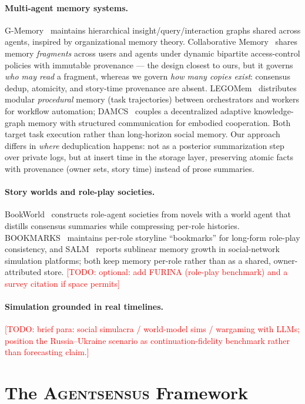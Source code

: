 \documentclass[11pt]{article}
\newcommand{\sysname}{\textsc{Agentsensus}}
\newcommand{\todo}[1]{\textcolor{red}{[TODO: #1]}}
\begin{document}
\paragraph{Multi-agent memory systems.}
G-Memory~\cite{gmemory2025} maintains hierarchical insight/query/interaction
graphs shared across agents, inspired by organizational memory theory.
Collaborative Memory~\cite{collabmem2025} shares memory \emph{fragments}
across users and agents under dynamic bipartite access-control policies with
immutable provenance --- the design closest to ours, but it governs
\emph{who may read} a fragment, whereas we govern \emph{how many copies
exist}: consensus dedup, atomicity, and story-time provenance are absent.
LEGOMem~\cite{legomem2025} distributes modular \emph{procedural} memory
(task trajectories) between orchestrators and workers for workflow
automation; DAMCS~\cite{damcs2025} couples a decentralized adaptive
knowledge-graph memory with structured communication for embodied
cooperation. Both target task execution rather than long-horizon social
memory. Our approach differs in \emph{where} deduplication happens: not as a
posterior summarization step over private logs, but at insert time in the
storage layer, preserving atomic facts with provenance (owner sets, story
time) instead of prose summaries.

\paragraph{Story worlds and role-play societies.}
BookWorld~\cite{chen2025bookworld} constructs role-agent societies from
novels with a world agent that distills consensus summaries while compressing
per-role histories. BOOKMARKS~\cite{bookmarks2026} maintains per-role
storyline ``bookmarks'' for long-form role-play consistency, and
SALM~\cite{salm2025} reports sublinear memory growth in social-network
simulation platforms; both keep memory per-role rather than as a shared,
owner-attributed store. \todo{optional: add FURINA (role-play benchmark) and
a survey citation if space permits}

\paragraph{Simulation grounded in real timelines.}
\todo{brief para: social simulacra / world-model sims / wargaming with LLMs;
position the Russia--Ukraine scenario as continuation-fidelity benchmark
rather than forecasting claim.}

\section{The \sysname{} Framework}
\label{sec:framework}
\end{document}
